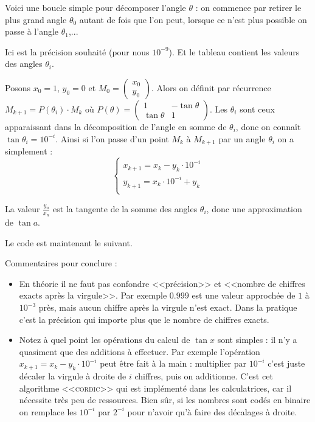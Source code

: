 \documentclass[class=report,crop=false]{standalone}
\begin{document}
 Voici une boucle simple pour décomposer l'angle $\theta$ :
 on commence par retirer le plus grand angle $\theta_0$ autant de fois que l'on peut, lorsque ce n'est plus possible on passe à l'angle
 $\theta_1$,...


 Ici  est la précision souhaité (pour nous $10^{-9}$).
 Et le tableau   contient les valeurs des angles $\theta_i$.

 Posons $x_0 = 1$, $y_0=0$ et $M_0=\begin{pmatrix}x_0\\y_0\end{pmatrix}$. Alors on définit par récurrence
 $M_{k+1} = P(\theta_i) \cdot M_k$
   où $P(\theta) = \begin{pmatrix} 1 & - \tan \theta \\ \tan \theta & 1 \end{pmatrix}$.
   Les $\theta_i$ sont ceux apparaissant dans la décomposition de l'angle en somme de $\theta_i$,
   donc on connaît $\tan \theta_i = 10^{-i}$. Ainsi si l'on passe d'un point $M_k$ à $M_{k+1}$
   par un angle $\theta_i$ on a simplement :
  $$ \left\{ \begin{array}{l}
        x_{k+1} = x_k - y_k \cdot 10^{-i} \\
        y_{k+1} = x_k \cdot 10^{-i}+ y_k \\
        \end{array}
\right. $$

   La valeur $\frac{y_n}{x_n}$ est la tangente de la somme des angles $\theta_i$, donc une approximation de $\tan a$.

   Le code est maintenant le suivant.



\bigskip


Commentaires pour conclure :
\begin{itemize}
  \item En théorie il ne faut pas confondre <<précision>> et <<nombre de chiffres exacts après la virgule>>.
  Par exemple $0.999$ est une valeur approchée de $1$ à $10^{-3}$ près, mais aucun chiffre après la virgule n'est exact.
  Dans la pratique c'est la précision qui importe plus que le nombre de chiffres exacts.

  \item Notez à quel point les opérations du calcul de $\tan x$ sont simples : il n'y a quasiment que des additions à effectuer.
  Par exemple l'opération $x_{k+1} = x_k - y_k \cdot 10^{-i}$ peut être fait à la main : multiplier par $10^{-i}$ c'est juste
  décaler la virgule à droite de $i$ chiffres, puis on additionne.
  C'est cet algorithme <<\textsc{cordic}>> qui est implémenté dans les calculatrices, car il nécessite très peu de ressources.
  Bien sûr, si les nombres sont codés en binaire on remplace les $10^{-i}$ par $2^{-i}$ pour
  n'avoir qu'à faire des décalages à droite.
\end{itemize}
\end{document}
